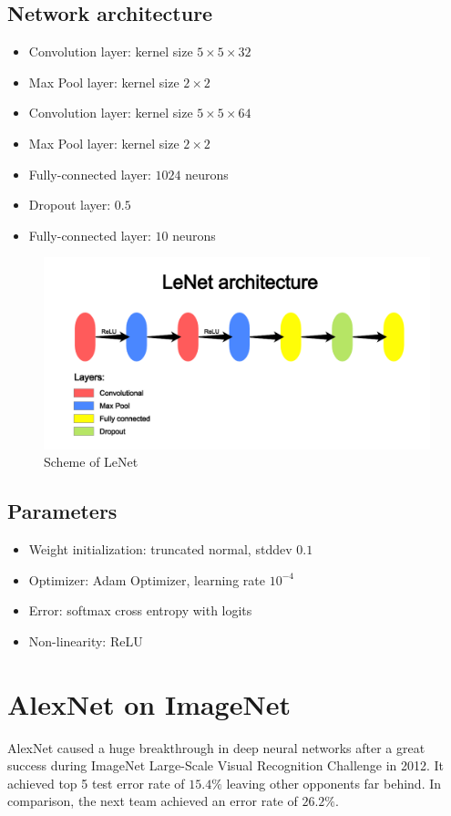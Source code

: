 \documentclass[licencjacka]{pracamgr}
\begin{document}
 		\subsection{Network architecture}
 			\begin{itemize}
 			\item Convolution layer: kernel size $5 \times 5 \times 32$
 			\item Max Pool layer: kernel size $2 \times 2$
 			\item Convolution layer: kernel size $5 \times 5 \times 64$
 			\item Max Pool layer: kernel size $2 \times 2$
 			\item Fully-connected layer: $1024$ neurons
 			\item Dropout layer: $0.5$
 			\item Fully-connected layer: $10$ neurons
 			\end{itemize}
 			\begin{figure}[h]
				\caption{Scheme of LeNet}
				\centering
				\includegraphics[width=\textwidth]{LeNet}
			\end{figure}
 		\subsection{Parameters}
 			\begin{itemize}
 			\item Weight initialization: truncated normal, stddev $0.1$
 			\item Optimizer: Adam Optimizer, learning rate $10^{-4}$
 			\item Error: softmax cross entropy with logits
 			\item Non-linearity: ReLU
 			\end{itemize}
 	\section{AlexNet on ImageNet}
 	AlexNet caused a huge breakthrough in deep neural networks after a great success during ImageNet Large-Scale Visual Recognition Challenge in 2012. It achieved top 5 test error rate of $15.4\%$ leaving other opponents far behind. In comparison, the next team achieved an error rate of $26.2\%$. 
\end{document}
